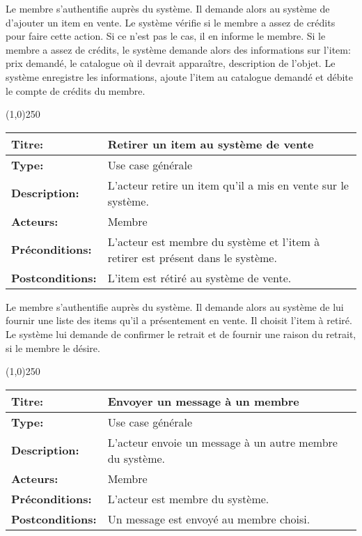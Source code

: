 \documentclass[letterpaper,11pt]{letter}
\begin{document}
Le membre s'authentifie auprès du système. Il demande alors au système de d'ajouter un item en vente. Le système vérifie si le membre a assez de 
crédits pour faire cette action. Si ce n'est pas le cas, il en informe le membre. Si le membre a assez de crédits, le système demande alors des informations sur l'item: prix demandé, le catalogue où il devrait apparaître, description de l'objet. Le système enregistre les informations, ajoute l'item au catalogue demandé et débite le compte de crédits du membre.

\begin{center}
\line(1,0){250}
\end{center}

\begin{tabular}{|l|p{}|}
  \hline
{\bf Titre:} & Retirer un item au système de vente\\
  \hline
{\bf Type:} & Use case générale\\
\hline
{\bf Description:} & L'acteur retire un item qu'il a mis en vente sur le système.\\
\hline
{\bf Acteurs:} & Membre\\
\hline
{\bf Préconditions:} & L'acteur est membre du système et l'item à retirer est présent dans le système.\\
\hline
{\bf Postconditions:} & L'item est rétiré au système de vente.\\
\hline
\end{tabular}

Le membre s'authentifie auprès du système. Il demande alors au système de lui fournir une liste des items qu'il a présentement en vente. Il choisit
l'item à retiré. Le système lui demande de confirmer le retrait et de fournir une raison du retrait, si le membre le désire.

\begin{center}
\line(1,0){250}
\end{center}

\begin{tabular}{|l|p{}|}
  \hline
{\bf Titre:} & Envoyer un message à un membre\\
  \hline
{\bf Type:} & Use case générale\\
\hline
{\bf Description:} & L'acteur envoie un message à un autre membre du système.\\
\hline
{\bf Acteurs:} & Membre\\
\hline
{\bf Préconditions:} & L'acteur est membre du système.\\
\hline
{\bf Postconditions:} & Un message est envoyé au membre choisi.\\
\hline
\end{tabular}
\end{document}
